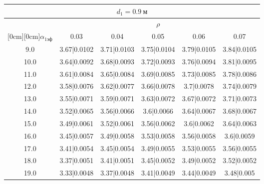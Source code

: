 \documentclass[20pt]{article}
\begin{document}
\begin{center}
\begin{tabular}{c|ccccc}
\hline
	\multicolumn{6}{c}{$d_{1}=0.9 \ м$} \\
\hline
	 & \multicolumn{5}{|c}{$\rho$} \\
	\cline{2-6}
	\raisebox{1.5ex}[0cm][0cm]{$\alpha_{1эф}$} & 0.03 & 0.04 & 0.05 & 0.06 & 0.07\\
\hline
	9.0 & 	3.67|0.0102 & 	3.71|0.0103 & 	3.75|0.0104 & 	3.79|0.0105 & 	3.84|0.0105\\
	10.0 & 	3.64|0.0092 & 	3.68|0.0093 & 	3.72|0.0093 & 	3.76|0.0094 & 	3.81|0.0095\\
	11.0 & 	3.61|0.0084 & 	3.65|0.0084 & 	3.69|0.0085 & 	3.73|0.0085 & 	3.78|0.0086\\
	12.0 & 	3.58|0.0076 & 	3.62|0.0077 & 	3.66|0.0078 & 	3.7|0.0078 & 	3.74|0.0079\\
	13.0 & 	3.55|0.0071 & 	3.59|0.0071 & 	3.63|0.0072 & 	3.67|0.0072 & 	3.71|0.0073\\
	14.0 & 	3.52|0.0065 & 	3.56|0.0066 & 	3.6|0.0066 & 	3.64|0.0067 & 	3.68|0.0067\\
	15.0 & 	3.49|0.0061 & 	3.52|0.0061 & 	3.56|0.0062 & 	3.6|0.0062 & 	3.64|0.0063\\
	16.0 & 	3.45|0.0057 & 	3.49|0.0058 & 	3.53|0.0058 & 	3.56|0.0058 & 	3.6|0.0059\\
	17.0 & 	3.41|0.0054 & 	3.45|0.0054 & 	3.49|0.0055 & 	3.53|0.0055 & 	3.56|0.0055\\
	18.0 & 	3.37|0.0051 & 	3.41|0.0051 & 	3.45|0.0052 & 	3.49|0.0052 & 	3.52|0.0052\\
	19.0 & 	3.33|0.0048 & 	3.37|0.0048 & 	3.41|0.0049 & 	3.44|0.0049 & 	3.48|0.005\\
\end{tabular}


\end{center}
\end{document}
